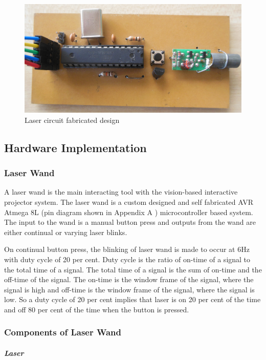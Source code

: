\documentclass[12pt, a4paper]{article}
\begin{document}
\begin{figure}[htp]
	\centering
	\includegraphics[scale=0.2]{front.png}
	\caption{Laser circuit fabricated design}
	\label{}
\end{figure}

\subsection{Hardware Implementation}
\subsubsection{Laser Wand}

A laser wand is the main interacting tool with the vision-based interactive projector system. The laser wand is a custom designed and self fabricated AVR Atmega 8L (pin diagram shown in Appendix A ) microcontroller based system. The input to the wand is a manual button press and outputs from the wand are either continual or varying laser blinks. 

On continual button press, the blinking of laser wand is made to occur at 6Hz with duty cycle of 20 per cent. Duty cycle is the ratio of on-time of a signal to the total time of a signal. The total time of a signal is the sum of on-time and the off-time of the signal. The on-time is the window frame of the signal, where the signal is high and off-time is the window frame of the signal, where the signal is low. So a duty cycle of 20 per cent implies that laser is on 20 per cent of the time and off 80 per cent of the time when the button is pressed. 

\subsubsection{Components of Laser Wand}

\subparagraph{Laser}
\end{document}
